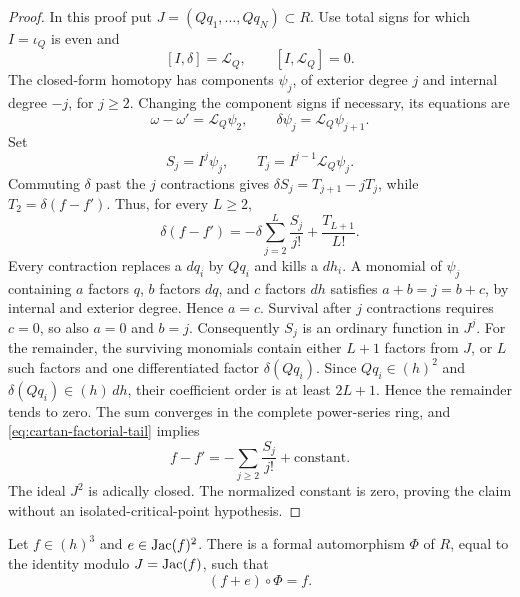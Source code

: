 \begin{proof}
In this proof put \(J=(Qq_1,\ldots,Qq_N)\subset R\).
Use total signs for which \(I=\iota_Q\) is even and
\[
                 [I,\delta]=\mathcal L_Q,
                 \qquad [I,\mathcal L_Q]=0.
\]
The closed-form homotopy has components \(\psi_j\), of exterior
degree \(j\) and internal degree \(-j\), for \(j\geq2\).
Changing the component signs if necessary, its equations are
\[
 \omega-\omega'=\mathcal L_Q\psi_2,
                  \qquad \delta\psi_j=\mathcal L_Q\psi_{j+1}.
\]
Set
\[
             S_j=I^j\psi_j,\qquad
             T_j=I^{j-1}\mathcal L_Q\psi_j.
\]
Commuting \(\delta\) past the \(j\) contractions gives
\(\delta S_j=T_{j+1}-jT_j\), while
\(T_2=\delta(f-f')\).  Thus, for every \(L\geq2\),
\begin{equation}
\label{eq:cartan-factorial-tail}
 \delta(f-f')=-\delta\sum_{j=2}^{L}\frac{S_j}{j!}
                                      +\frac{T_{L+1}}{L!}.
\end{equation}
Every contraction replaces a \(dq_i\) by \(Qq_i\) and kills a
\(dh_i\).  A monomial of \(\psi_j\) containing \(a\) factors \(q\),
\(b\) factors \(dq\), and \(c\) factors \(dh\) satisfies
\(a+b=j=b+c\), by internal and exterior degree.  Hence \(a=c\).
Survival after \(j\) contractions requires \(c=0\), so also \(a=0\)
and \(b=j\).  Consequently \(S_j\) is an ordinary function in \(J^j\).
For the remainder, the surviving monomials contain either \(L+1\)
factors from \(J\), or \(L\) such factors and one differentiated
factor \(\delta(Qq_i)\).  Since
\(Qq_i\in(h)^2\) and \(\delta(Qq_i)\in(h)\,dh\), their coefficient
order is at least \(2L+1\).  Hence the remainder tends to zero.
The sum converges in the complete power-series ring, and
\eqref{eq:cartan-factorial-tail} implies
\[
                 f-f'=-\sum_{j\geq2}\frac{S_j}{j!}+\text{constant}.
\]
The ideal \(J^2\) is adically closed.  The normalized constant is
zero, proving the claim without an isolated-critical-point hypothesis.
\end{proof}

\begin{lemma}
\label{lem:jacobian-square-flow}
Let \(f\in(h)^3\) and \(e\in\operatorname{Jac}(f)^2\).
There is a formal automorphism \(\Phi\) of \(R\), equal to the
identity modulo \(J=\operatorname{Jac}(f)\), such that
\[
                           (f+e)\circ\Phi=f.
\]
\end{lemma}

